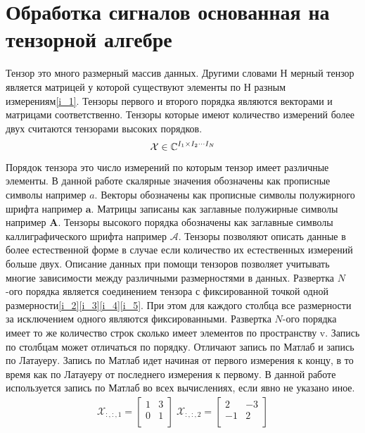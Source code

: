 \section{Обработка сигналов основанная на тензорной алгебре}
Тензор это много размерный массив данных. Другими словами Н мерный тензор является матрицей у которой существуют элементы по Н разным измерениям\eqref{i_1}\cite{Book6}. Тензоры первого и второго порядка являются векторами и матрицами соответственно. Тензоры которые имеют количество измерений более двух считаются тензорами высоких порядков\cite{Book7}. 
\begin{align}
\mathcal{X} \in \mathbb{C}^{I_1\times I_2\cdots I_N}
\label{i_1}
\end{align}
Порядок тензора это число измерений по которым тензор имеет различные элементы. В данной работе скалярные значения обозначены как прописные символы например $a$. Векторы обозначены как прописные символы полужирного шрифта например $\mathbf{a}$. Матрицы записаны как заглавные полужирные символы например $\mathbf{A}$. Тензоры высокого порядка обозначены как заглавные символы каллиграфического шрифта например $\mathcal{A}$. Тензоры позволяют описать данные в более естественной форме в случае если количество их естественных измерений больше двух. Описание данных при помощи тензоров позволяет учитывать многие зависимости между различными размерностями в данных. 
Развертка $N$-ого порядка является соединением тензора с фиксированной точкой одной размерности\eqref{i_2}\eqref{i_3}\eqref{i_4}\eqref{i_5}\cite{Book16}. При этом для каждого столбца все размерности за исключением одного являются фиксированными.  Развертка $N$-ого порядка имеет то же количество строк сколько имеет элементов по пространству v. Запись по столбцам может отличаться по порядку. Отличают запись по Матлаб и запись по Латауеру. Запись по Матлаб идет начиная от первого измерения к концу\cite{Book19}, в то время как по Латауеру от последнего измерения к первому. В данной работе используется запись по Матлаб во всех вычислениях, если явно не указано иное.
\begin{align}
\mathcal{X}_{:,:,1}=\begin{bmatrix}
1&3\\ 
0&1\\
\end{bmatrix} \; \mathcal{X}_{:,:,2}=\begin{bmatrix}
2&-3\\ 
-1&2\\
\end{bmatrix}
\label{i_2}
\end{align}
